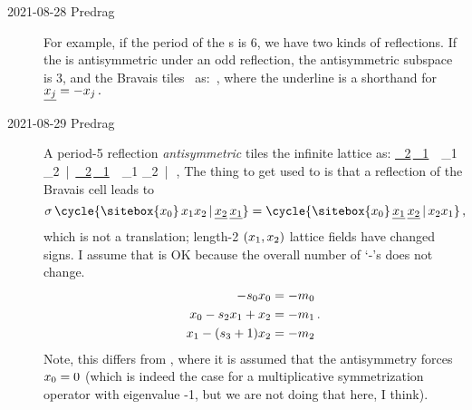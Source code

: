 \begin{description}


\item[2021-08-28 Predrag]
For example, if the period of the {\lattstate}s is 6, we have two kinds
of reflections. If the {\lattstate} is antisymmetric under an odd
reflection, the antisymmetric subspace is 3\dmn,
and the Bravais {\lattstate} tiles \lattice\ as:
\beq
{}
\,,
where the underline is a shorthand for
\(
\underline{x_j}= - x_j
\,.
\)

    \item[2021-08-29 Predrag]
A period-5 reflection \emph{antisymmetric {\lattstate}} tiles the infinite
lattice as:
\beq
\cdots
\underline{\ssp_2}\,\underline{\ssp_1}
    \,\,
\ssp_1 \ssp_2
    \,|\,
\underline{\ssp_2}\,\underline{\ssp_1}
    \,\,
\ssp_1 \ssp_2
    \,|\,
\cdots
\,,
The thing to get used to is that a reflection of the Bravais cell
leads to
\[
  \Refl\,\cycle{\sitebox{\ssp_0}\,
\ssp_1 \ssp_2
    \,|\,
\underline{\ssp_2}\,\underline{\ssp_1}}
   =
\cycle{\sitebox{\ssp_0}\,
\underline{\ssp_1}\,\underline{\ssp_2}
    \,|\,
\ssp_2 \ssp_1  }
\,,
\]
which is not a translation; length-2
{\brick} $(x_1,x_2)$ lattice fields have changed signs.
I assume that is OK because the overall number of `-'s does not change.
\[
\begin{aligned}
-{s}_0x_0  = -m_0 \\
x_0 -{s}_2x_1 +x_2 = -m_1 \\
x_1 -({s}_3+1) x_2 = -m_2
\end{aligned}
\,.
\]
Note, this differs from , where
it is assumed that the antisymmetry forces $x_0=0$ (which
is indeed the case for a multiplicative symmetrization operator
with eigenvalue -1, but we are not doing that here, I think).


\end{description}
